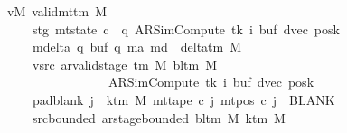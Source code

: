 \begin{isabellebody}
\ \ \ vM{\isacharcolon}{\kern0pt}\ {\isachardoublequoteopen}valid{\isacharunderscore}{\kern0pt}mttm\ M{\isachardoublequoteclose}\isanewline
\ \ \ \ \ \ \ stg{\isacharcolon}{\kern0pt}\ {\isachardoublequoteopen}mt{\isacharunderscore}{\kern0pt}state\ c{\isacharprime}{\kern0pt}\ {\isacharequal}{\kern0pt}\ {\isacharparenleft}{\kern0pt}q{\isacharcomma}{\kern0pt}\ AR{\isacharunderscore}{\kern0pt}SimCompute{\isacharcomma}{\kern0pt}\ tk{\isacharcomma}{\kern0pt}\ i{\isacharcomma}{\kern0pt}\ buf{\isacharcomma}{\kern0pt}\ dvec{\isacharcomma}{\kern0pt}\ posk{\isacharparenright}{\kern0pt}{\isachardoublequoteclose}\isanewline
\ \ \ \ \ \ \ mdelta{\isacharcolon}{\kern0pt}\ {\isachardoublequoteopen}{\isacharparenleft}{\kern0pt}q{\isacharcomma}{\kern0pt}\ buf{\isacharcomma}{\kern0pt}\ q{\isacharprime}{\kern0pt}{\isacharcomma}{\kern0pt}\ m{\isacharunderscore}{\kern0pt}a{\isacharprime}{\kern0pt}{\isacharcomma}{\kern0pt}\ m{\isacharunderscore}{\kern0pt}d{\isacharparenright}{\kern0pt}\ {\isasymin}\ delta{\isacharunderscore}{\kern0pt}tm\ M{\isachardoublequoteclose}\isanewline
\ \ \ \ \ \ \ vsrc{\isacharcolon}{\kern0pt}\ {\isachardoublequoteopen}ar{\isacharunderscore}{\kern0pt}valid{\isacharunderscore}{\kern0pt}stage\ {\isacharparenleft}{\kern0pt}{\isasymGamma}{\isacharunderscore}{\kern0pt}tm\ M{\isacharparenright}{\kern0pt}\ {\isacharparenleft}{\kern0pt}bl{\isacharunderscore}{\kern0pt}tm\ M{\isacharparenright}{\kern0pt}\isanewline
\ \ \ \ \ \ \ \ \ \ \ \ \ \ \ \ \ \ \ {\isacharparenleft}{\kern0pt}AR{\isacharunderscore}{\kern0pt}SimCompute{\isacharcomma}{\kern0pt}\ tk{\isacharcomma}{\kern0pt}\ i{\isacharcomma}{\kern0pt}\ buf{\isacharcomma}{\kern0pt}\ dvec{\isacharcomma}{\kern0pt}\ posk{\isacharparenright}{\kern0pt}{\isachardoublequoteclose}\isanewline
\ \ \ \ \ \ \ pad{\isacharunderscore}{\kern0pt}blank{\isacharcolon}{\kern0pt}\ {\isachardoublequoteopen}{\isasymforall}j\ {\isasymge}\ k{\isacharunderscore}{\kern0pt}tm\ M{\isachardot}{\kern0pt}\ mt{\isacharunderscore}{\kern0pt}tape\ c{\isacharprime}{\kern0pt}\ j\ {\isacharparenleft}{\kern0pt}mt{\isacharunderscore}{\kern0pt}pos\ c{\isacharprime}{\kern0pt}\ j{\isacharparenright}{\kern0pt}\ {\isacharequal}{\kern0pt}\ BLANK{}{\isachardoublequoteclose}\isanewline
\ \ \ \ \ \ \ src{\isacharunderscore}{\kern0pt}bounded{\isacharcolon}{\kern0pt}\ {\isachardoublequoteopen}ar{\isacharunderscore}{\kern0pt}stage{\isacharunderscore}{\kern0pt}bounded\ {\isacharparenleft}{\kern0pt}bl{\isacharunderscore}{\kern0pt}tm\ M{\isacharparenright}{\kern0pt}\ {\isacharparenleft}{\kern0pt}k{\isacharunderscore}{\kern0pt}tm\ M{\isacharparenright}{\kern0pt}\isanewline

\end{isabellebody}
